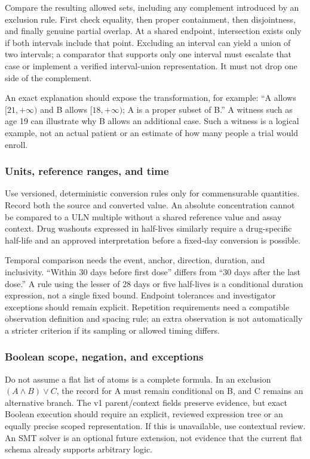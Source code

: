 \documentclass[10pt,letterpaper]{article}
\begin{document}
Compare the resulting allowed sets, including any complement introduced by
an exclusion rule. First check equality, then proper containment, then
disjointness, and finally genuine partial overlap. At a shared endpoint,
intersection exists only if both intervals include that point. Excluding an
interval can yield a union of two intervals; a comparator that supports only
one interval must escalate that case or implement a verified interval-union
representation. It must not drop one side of the complement.

An exact explanation should expose the transformation, for example:
``A allows $[21,+\infty)$ and B allows $[18,+\infty)$; A is a proper subset
of B.'' A witness such as age 19 can illustrate why B allows an additional
case. Such a witness is a logical example, not an actual patient or an estimate
of how many people a trial would enroll.

\subsubsection{Units, reference ranges, and time}
Use versioned, deterministic conversion rules only for commensurable
quantities. Record both the source and converted value. An absolute
concentration cannot be compared to a ULN multiple without a shared reference
value and assay context. Drug washouts expressed in half-lives similarly
require a drug-specific half-life and an approved interpretation before a
fixed-day conversion is possible.

Temporal comparison needs the event, anchor, direction, duration, and
inclusivity. ``Within 30 days before first dose'' differs from ``30 days after
the last dose.'' A rule using the lesser of 28 days or five half-lives is a
conditional duration expression, not a single fixed bound. Endpoint
tolerances and investigator exceptions should remain explicit. Repetition
requirements need a compatible observation definition and spacing rule; an
extra observation is not automatically a stricter criterion if its sampling
or allowed timing differs.

\subsubsection{Boolean scope, negation, and exceptions}
Do not assume a flat list of atoms is a complete formula. In an exclusion
$(A\land B)\lor C$, the record for A must remain conditional on B, and C
remains an alternative branch. The v1 parent/context fields preserve evidence,
but exact Boolean execution should require an explicit, reviewed expression
tree or an equally precise scoped representation. If this is unavailable,
use contextual review. An SMT solver is an optional future extension, not
evidence that the current flat schema already supports arbitrary logic.
\end{document}
